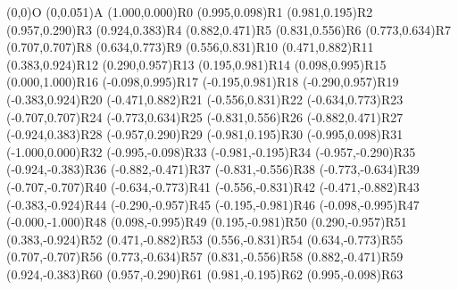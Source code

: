 \pstGeonode(0,0){O}
\pstGeonode(0,0.051){A}
\pstGeonode(1.000,0.000){R0}
\pstGeonode(0.995,0.098){R1}
\pstGeonode(0.981,0.195){R2}
\pstGeonode(0.957,0.290){R3}
\pstGeonode(0.924,0.383){R4}
\pstGeonode(0.882,0.471){R5}
\pstGeonode(0.831,0.556){R6}
\pstGeonode(0.773,0.634){R7}
\pstGeonode(0.707,0.707){R8}
\pstGeonode(0.634,0.773){R9}
\pstGeonode(0.556,0.831){R10}
\pstGeonode(0.471,0.882){R11}
\pstGeonode(0.383,0.924){R12}
\pstGeonode(0.290,0.957){R13}
\pstGeonode(0.195,0.981){R14}
\pstGeonode(0.098,0.995){R15}
\pstGeonode(0.000,1.000){R16}
\pstGeonode(-0.098,0.995){R17}
\pstGeonode(-0.195,0.981){R18}
\pstGeonode(-0.290,0.957){R19}
\pstGeonode(-0.383,0.924){R20}
\pstGeonode(-0.471,0.882){R21}
\pstGeonode(-0.556,0.831){R22}
\pstGeonode(-0.634,0.773){R23}
\pstGeonode(-0.707,0.707){R24}
\pstGeonode(-0.773,0.634){R25}
\pstGeonode(-0.831,0.556){R26}
\pstGeonode(-0.882,0.471){R27}
\pstGeonode(-0.924,0.383){R28}
\pstGeonode(-0.957,0.290){R29}
\pstGeonode(-0.981,0.195){R30}
\pstGeonode(-0.995,0.098){R31}
\pstGeonode(-1.000,0.000){R32}
\pstGeonode(-0.995,-0.098){R33}
\pstGeonode(-0.981,-0.195){R34}
\pstGeonode(-0.957,-0.290){R35}
\pstGeonode(-0.924,-0.383){R36}
\pstGeonode(-0.882,-0.471){R37}
\pstGeonode(-0.831,-0.556){R38}
\pstGeonode(-0.773,-0.634){R39}
\pstGeonode(-0.707,-0.707){R40}
\pstGeonode(-0.634,-0.773){R41}
\pstGeonode(-0.556,-0.831){R42}
\pstGeonode(-0.471,-0.882){R43}
\pstGeonode(-0.383,-0.924){R44}
\pstGeonode(-0.290,-0.957){R45}
\pstGeonode(-0.195,-0.981){R46}
\pstGeonode(-0.098,-0.995){R47}
\pstGeonode(-0.000,-1.000){R48}
\pstGeonode(0.098,-0.995){R49}
\pstGeonode(0.195,-0.981){R50}
\pstGeonode(0.290,-0.957){R51}
\pstGeonode(0.383,-0.924){R52}
\pstGeonode(0.471,-0.882){R53}
\pstGeonode(0.556,-0.831){R54}
\pstGeonode(0.634,-0.773){R55}
\pstGeonode(0.707,-0.707){R56}
\pstGeonode(0.773,-0.634){R57}
\pstGeonode(0.831,-0.556){R58}
\pstGeonode(0.882,-0.471){R59}
\pstGeonode(0.924,-0.383){R60}
\pstGeonode(0.957,-0.290){R61}
\pstGeonode(0.981,-0.195){R62}
\pstGeonode(0.995,-0.098){R63}
